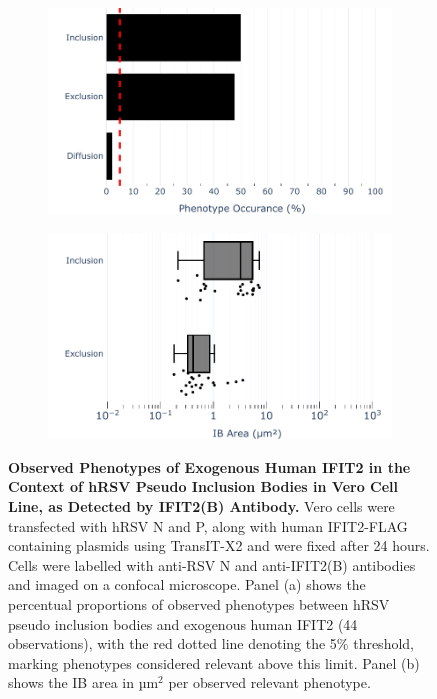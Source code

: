 \begin{figure}
    \begin{subfigure}{0.495\textwidth}
        \caption{}
        \includegraphics[width=1\linewidth]{09. Chapter 4/Figs/01. pIB/03. IFIT2/04. IFIT2-FLAG/02. IFIT2B/01. bar_i2b_hnhp.pdf}
    \end{subfigure}
    \begin{subfigure}{0.495\textwidth}
        \caption{}
        \includegraphics[width=1\linewidth]{09. Chapter 4/Figs/01. pIB/03. IFIT2/04. IFIT2-FLAG/02. IFIT2B/02. box_i2a_hnhp.pdf}
    \end{subfigure}
    \caption[Observed Phenotypes of Exogenous Human IFIT2 in the Context of hRSV Pseudo Inclusion Bodies in Vero Cell Line, as Detected by IFIT2(B) Antibody.]{\textbf{Observed Phenotypes of Exogenous Human IFIT2 in the Context of hRSV Pseudo Inclusion Bodies in Vero Cell Line, as Detected by IFIT2(B) Antibody.} Vero cells were transfected with hRSV N and P, along with human IFIT2-FLAG containing plasmids using TransIT-X2 and were fixed after 24 hours. Cells were labelled with anti-RSV N and anti-IFIT2(B) antibodies and imaged on a confocal microscope. Panel (a) shows the percentual proportions of observed phenotypes between hRSV pseudo inclusion bodies and exogenous human IFIT2 (44 observations), with the red dotted line denoting the 5\% threshold, marking phenotypes considered relevant above this limit. Panel (b) shows the IB area in \(\mbox{µm}^2\) per observed relevant phenotype.}
    \label{fig:Observed Phenotypes of Exogenous Human IFIT2 in the Context of hRSV Pseudo Inclusion Bodies in Vero Cell Line, as Detected by IFIT2(B) Antibody}
\end{figure}

